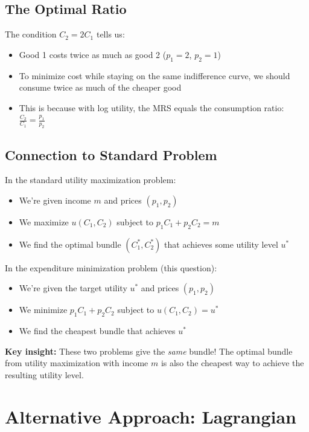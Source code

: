\documentclass[12pt]{article}
\begin{document}
\subsection*{The Optimal Ratio}

The condition $C_2 = 2C_1$ tells us:
\begin{itemize}
\item Good 1 costs twice as much as good 2 ($p_1 = 2$, $p_2 = 1$)
\item To minimize cost while staying on the same indifference curve, we should consume twice as much of the cheaper good
\item This is because with log utility, the MRS equals the consumption ratio: $\frac{C_2}{C_1} = \frac{p_1}{p_2}$
\end{itemize}

\subsection*{Connection to Standard Problem}

In the standard utility maximization problem:
\begin{itemize}
\item We're given income $m$ and prices $(p_1, p_2)$
\item We maximize $u(C_1, C_2)$ subject to $p_1 C_1 + p_2 C_2 = m$
\item We find the optimal bundle $(C_1^*, C_2^*)$ that achieves some utility level $u^*$
\end{itemize}

In the expenditure minimization problem (this question):
\begin{itemize}
\item We're given the target utility $u^*$ and prices $(p_1, p_2)$
\item We minimize $p_1 C_1 + p_2 C_2$ subject to $u(C_1, C_2) = u^*$
\item We find the cheapest bundle that achieves $u^*$
\end{itemize}

\textbf{Key insight:} These two problems give the \textit{same} bundle! The optimal bundle from utility maximization with income $m$ is also the cheapest way to achieve the resulting utility level.

\section*{Alternative Approach: Lagrangian}
\end{document}
